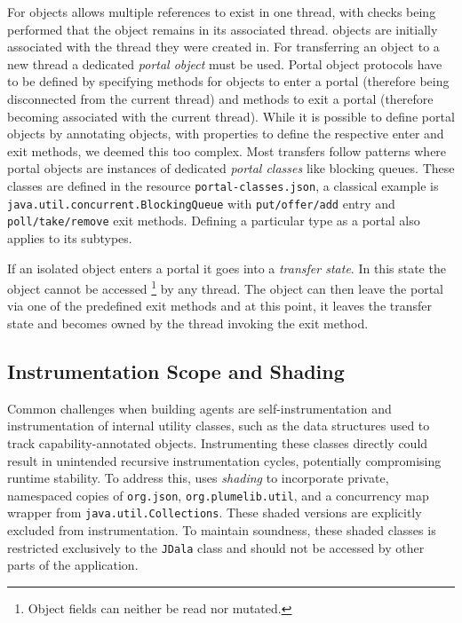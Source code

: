 For \Isolated objects \jdala allows multiple references to exist in one thread, with checks being performed that the object remains in its associated thread. \Isolated objects are initially associated with the thread they were created in. For transferring an \Isolated object to a new thread a dedicated \textit{portal object} must be used. Portal object protocols have to be defined by specifying methods for objects to enter a portal (therefore being disconnected from the current thread) and methods to exit a portal (therefore becoming associated with the current thread).  While it is possible to define portal objects by annotating objects, with properties to define the respective enter and exit methods, we deemed this too complex. Most transfers follow patterns where portal objects are instances of dedicated \textit{portal classes} like blocking queues.  
These classes are defined in the resource \texttt{portal-classes.json}, a classical example is\texttt{ java.util.concurrent.BlockingQueue} with \texttt{put/\-offer/\-add} entry  and \texttt{poll/\-take/\-remove} exit methods. Defining a particular type as a portal also applies to its subtypes. 

If an isolated object enters a portal it goes into a \textit{transfer state}. In this state the object cannot be accessed \footnote{Object fields can neither be read nor mutated.} by any thread. The object can then leave the portal via one of the predefined exit methods and at this point, it leaves the transfer state and becomes owned by the thread invoking the exit method.


\subsection{Instrumentation Scope and Shading}

Common challenges when building agents are self-instrumentation and instrumentation of internal utility classes, such as the data structures used to track capability-annotated objects. Instrumenting these classes directly could result in unintended recursive instrumentation cycles, potentially compromising runtime stability. To address this, \jdala uses \textit{shading} to incorporate private, namespaced copies of \texttt{org.json}, \texttt{org.plumelib.util}, and a concurrency map wrapper from \texttt{java.util.Collections}. These shaded versions are explicitly excluded from instrumentation. To maintain soundness, these shaded classes is restricted exclusively to the \texttt{JDala} class and should not be accessed by other parts of the application. 

